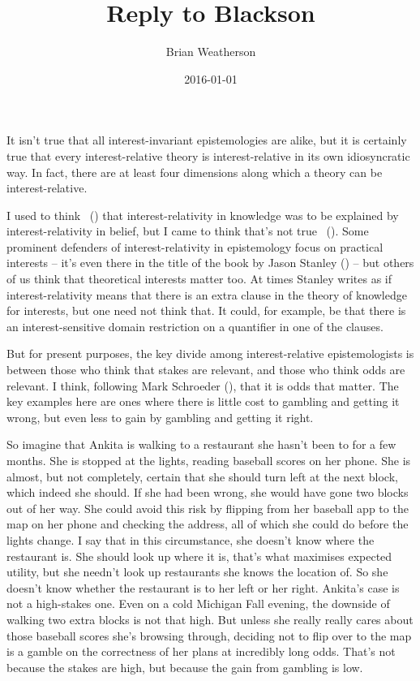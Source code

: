 \documentclass[
  11pt,
  letterpaper,
  DIV=11,
  numbers=noendperiod]{scrartcl}
\title{Reply to Blackson}
\author{Brian Weatherson}
\date{2016-01-01}
\begin{document}
\maketitle
It isn't true that all interest-invariant epistemologies are alike, but
it is certainly true that every interest-relative theory is
interest-relative in its own idiosyncratic way. In fact, there are at
least four dimensions along which a theory can be interest-relative.

I used to think ~()
that interest-relativity in knowledge was to be explained by
interest-relativity in belief, but I came to think that's not true
~(). Some prominent
defenders of interest-relativity in epistemology focus on practical
interests -- it's even there in the title of the book by Jason Stanley
() -- but others of us think that
theoretical interests matter too. At times Stanley writes as if
interest-relativity means that there is an extra clause in the theory of
knowledge for interests, but one need not think that. It could, for
example, be that there is an interest-sensitive domain restriction on a
quantifier in one of the clauses.

But for present purposes, the key divide among interest-relative
epistemologists is between those who think that stakes are relevant, and
those who think odds are relevant. I think, following Mark Schroeder
(), that it is odds that matter. The
key examples here are ones where there is little cost to gambling and
getting it wrong, but even less to gain by gambling and getting it
right.

So imagine that Ankita is walking to a restaurant she hasn't been to for
a few months. She is stopped at the lights, reading baseball scores on
her phone. She is almost, but not completely, certain that she should
turn left at the next block, which indeed she should. If she had been
wrong, she would have gone two blocks out of her way. She could avoid
this risk by flipping from her baseball app to the map on her phone and
checking the address, all of which she could do before the lights
change. I say that in this circumstance, she doesn't know where the
restaurant is. She should look up where it is, that's what maximises
expected utility, but she needn't look up restaurants she knows the
location of. So she doesn't know whether the restaurant is to her left
or her right. Ankita's case is not a high-stakes one. Even on a cold
Michigan Fall evening, the downside of walking two extra blocks is not
that high. But unless she really really cares about those baseball
scores she's browsing through, deciding not to flip over to the map is a
gamble on the correctness of her plans at incredibly long odds. That's
not because the stakes are high, but because the gain from gambling is
low.
\end{document}
